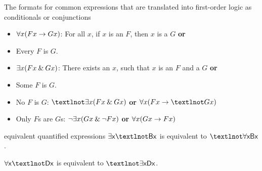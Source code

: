 
\begin{factboxy-width}[width=9.6cm]{The formats for common expressions that are translated into first-order logic as conditionals or conjunctions}
\begin{small}
\begin{itemize}
  \setlength{\itemsep}{1pt}
  \setlength{\parskip}{0pt}
  \setlength{\parsep}{0pt}
  \setlength{\itemindent}{-1cm}
\item[] $\forall x(Fx \rightarrow Gx)$: For all $x$, if $x$ is an $F$, then $x$ is a $G$ \textbf{or} %
\item[] \hspace{24mm}Every $F$ is $G$.\medskip
\item[] $\exists x(Fx \mathbin{\&} Gx)$: There exists an $x$, such that $x$ is an $F$ and a $G$ \textbf{or}
\item[] \hspace{24mm}Some $F$ is $G$.\medskip
\item[] No $F$ is $G$: $¬\exists x(Fx \eand Gx) $ \textbf{or} $\forall x(Fx \eif ¬Gx)$\medskip
\item[] Only $F$s are $G$s: ${\neg} \exists x(Gx \mathbin{\&} {\neg} Fx)$ \textbf{or} $\forall x(Gx \rightarrow Fx)$
\end{itemize}
\end{small}
\end{factboxy-width}

\begin{factboxy-width}[width=7cm]{equivalent quantified expressions}
$\exists \meta{x} ¬\meta{Bx} $ is equivalent to $¬\forall \meta{x Bx}$.\medskip

$\forall \meta{x} ¬\meta{Dx}$ is equivalent to $¬\exists \meta{x Dx}$.
\end{factboxy-width}



